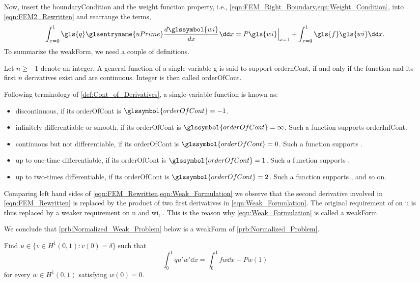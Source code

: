 Now, insert the \gls{boundaryCondition} and the weight function property, i.e., \cref{eqn:FEM_Right_Boundary,eqn:Weight_Condition},
into \cref{eqn:FEM2_Rewritten} and rearrange the terms,
\begin{equation} \label{eqn:Weak_Formulation}
	\int_{x = 0}^{1} \gls{q} \glsentryname{uPrime} \frac{ d \glssymbol{wi} }{dx} \dd x = P  \gls{wi} \Big \vert_{x = 1} + \int_{x = 0}^{1} \gls{f} \gls{wi} \dd x.
\end{equation}
%
To summarize the \gls{weakForm}, we need a couple of definitions.
\begin{definition} \label{def:Cont_of_Derivatives}
	Let $n \geq -1$ denote an integer. A general function of a single variable \gls{g} is said to support \gls{ordernCont},
	if and only if the function and its first $n$ derivatives exist and are continuous.
	Integer  is then called \gls{orderOfCont}.
\end{definition}
Following terminology of \cref{def:Cont_of_Derivatives}, a single-variable function is known as:
\begin{itemize}
	\item discontinuous, if its \gls{orderOfCont} is $\glssymbol{orderOfCont} = -1$.
	\item infinitely differentiable or smooth, if its \gls{orderOfCont} is $\glssymbol{orderOfCont} = \infty$.
		Such a function supports \gls{orderInfCont}.
	\item continuous but not differentiable, if its \gls{orderOfCont} is $\glssymbol{orderOfCont} = 0$.
		Such a function supports .
	\item up to one-time differentiable, if its \gls{orderOfCont} is $\glssymbol{orderOfCont} = 1$.
		Such a function supports .
	\item up to two-times differentiable, if its \gls{orderOfCont} is $\glssymbol{orderOfCont} = 2$.
		Such a function supports , and so on.
\end{itemize}
%
\begin{remark}
	Comparing left hand sides of \cref{eqn:FEM_Rewritten,eqn:Weak_Formulation} we observe that the second derivative involved in
	\cref{eqn:FEM_Rewritten} is replaced by the product of two first derivatives in \cref{eqn:Weak_Formulation}. The original
	requirement of  on \gls{u} is thus replaced by a weaker requirement on \gls{u} and \gls{wi},
	. This is the reason why \cref{eqn:Weak_Formulation} is called a \gls{weakForm}.
\end{remark}
We conclude that \cref{prb:Normalized_Weak_Problem} below is a \gls{weakForm} of \cref{prb:Normalized_Problem}.
\begin{problem}	\label{prb:Normalized_Weak_Problem}
	Find $u \in \{v \in H^1(0,1):v(0)=\delta\}$ such that
	\begin{equation}	\label{eqn:Normalized_Weak_Diff_Eq}
		\int_0^1 q u' w' \dd x = \int_0^1 f w \dd x + P w(1)
	\end{equation}
	for every $w \in H^1(0,1)$ satisfying $w(0)=0$.
\end{problem}
